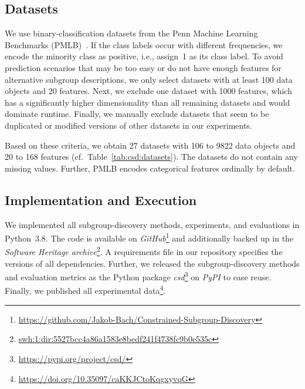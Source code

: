 \documentclass{article}
\theoremstyle{definition}
\begin{document}
\subsection{Datasets}
\label{sec:csd:experimental-design:datasets}

We use binary-classification datasets from the Penn Machine Learning Benchmarks (PMLB)~\cite{olson2017pmlb, romano2021pmlb}.
If the class labels occur with different frequencies, we encode the minority class as positive, i.e., assign~1 as its class label.
To avoid prediction scenarios that may be too easy or do not have enough features for alternative subgroup descriptions, we only select datasets with at least 100 data objects and 20 features.
Next, we exclude one dataset with 1000 features, which has a significantly higher dimensionality than all remaining datasets and would dominate runtime.
Finally, we manually exclude datasets that seem to be duplicated or modified versions of other datasets in our experiments.

Based on these criteria, we obtain 27 datasets with 106 to 9822 data objects and 20 to 168 features (cf.~Table~\ref{tab:csd:datasets}).
The datasets do not contain any missing values.
Further, PMLB encodes categorical features ordinally by default.

\subsection{Implementation and Execution}
\label{sec:csd:experimental-design:implementation}

We implemented all subgroup-discovery methods, experiments, and evaluations in Python~3.8.
The code is available on \emph{GitHub}\footnote{\url{https://github.com/Jakob-Bach/Constrained-Subgroup-Discovery}} and additionally backed up in the \emph{Software Heritage archive}\footnote{\href{https://archive.softwareheritage.org/swh:1:dir:5527bcc4a86a1583e8bedf241f4738fc9b0e535c;origin=https://github.com/Jakob-Bach/Constrained-Subgroup-Discovery;visit=swh:1:snp:8f87dcdf0277985d373245e5a23a128efc861153;anchor=swh:1:rev:0c0e4a978c95d881c4c20eecdd5a1ae12ee08ac3}{swh:1:dir:5527bcc4a86a1583e8bedf241f4738fc9b0e535c}}.
A requirements file in our repository specifies the versions of all dependencies.
Further, we released the subgroup-discovery methods and evaluation metrics as the Python package \emph{csd}\footnote{\url{https://pypi.org/project/csd/}} on \emph{PyPI} to ease reuse.
Finally, we published all experimental data\footnote{\url{https://doi.org/10.35097/caKKJCtoKqgxyvqG}}.
\end{document}
